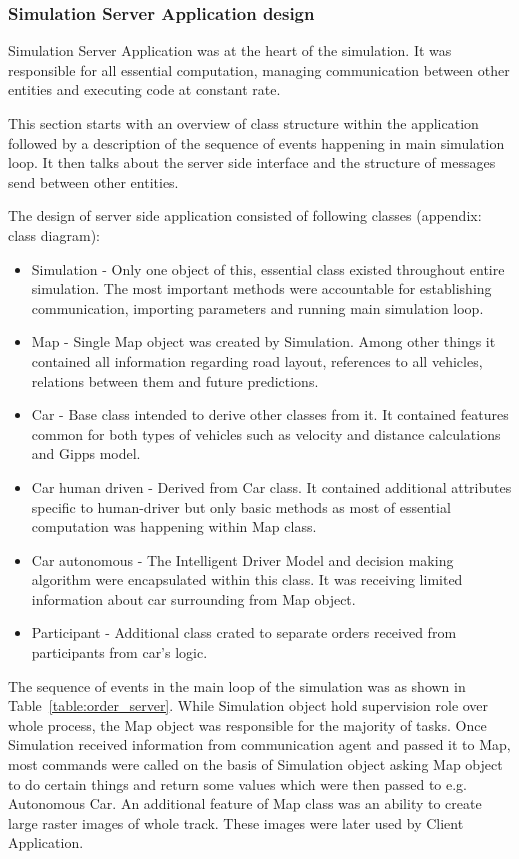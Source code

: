 \documentclass[11pt,english]{article}
\begin{document}
\subsubsection{Simulation Server Application design}


Simulation Server Application was at the heart of the simulation. It was responsible for all essential computation, managing communication between other entities and executing code at constant rate.
\par
This section starts with an overview of class structure within the application followed by a description of the sequence of events happening in main simulation loop. It then talks about the server side interface and the structure of messages send between other entities.

\par

The design of server side application consisted of following classes (appendix: class diagram):

\begin{itemize}
\item Simulation - Only one object of this, essential class existed throughout entire simulation. The most important methods were accountable for establishing communication, importing parameters and running main simulation loop.
\item Map - Single Map object was created by Simulation. Among other things it contained all information regarding road layout, references to all vehicles, relations between them and future predictions. 
\item Car - Base class intended to derive other classes from it. It contained features common for both types of vehicles such as velocity and distance calculations and Gipps model.
\item Car human driven - Derived from Car class. It contained additional attributes specific to human-driver but only basic methods as most of essential computation was happening within Map class.
\item Car autonomous - The Intelligent Driver Model and decision making algorithm were encapsulated within this class. It was receiving limited information about car surrounding from Map object.
\item Participant - Additional class crated to separate orders received from participants from car's logic.
\end{itemize}


The sequence of events in the main loop of the simulation was as shown in Table~\ref{table:order_server}. While Simulation object hold supervision role over whole process, the Map object was responsible for the majority of tasks. Once Simulation received information from communication agent and passed it to Map, most commands were called on the basis of Simulation object asking Map object to do certain things and return some values which were then passed to e.g. Autonomous Car. An additional feature of Map class was an ability to create large raster images of whole track. These images were later used by Client Application.
\end{document}
